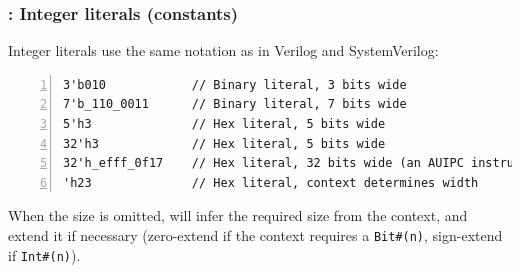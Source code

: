 \begin{frame}[fragile]
\frametitle{{\BSV}: Integer literals (constants)}

\footnotesize

Integer literals use the same notation as in Verilog and SystemVerilog:

\vspace{1ex}

\begin{Verbatim}[frame=single, numbers=left]
3'b010            // Binary literal, 3 bits wide
7'b_110_0011      // Binary literal, 7 bits wide
5'h3              // Hex literal, 5 bits wide
32'h3             // Hex literal, 5 bits wide
32'h_efff_0f17    // Hex literal, 32 bits wide (an AUIPC instruction)
'h23              // Hex literal, context determines width
\end{Verbatim}

\PAUSE{\vspace{1ex}}

When the size is omitted, {\bsc} will infer the required size from the
context, and extend it if necessary (zero-extend if the context
requires a \verb|Bit#(n)|, sign-extend if \verb|Int#(n)|).

\end{frame}


